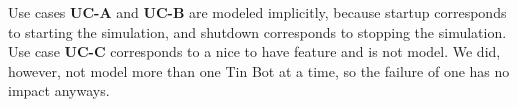 \documentclass[a4paper,parskip,headheight=38pt]{scrartcl} %
\begin{document}


Use cases \textbf{UC-A} and \textbf{UC-B} are modeled implicitly, because startup corresponds to starting the simulation, and shutdown corresponds to stopping the simulation.
Use case \textbf{UC-C} corresponds to a nice to have feature and is not model. We did, however, not model more than one Tin Bot at a time, so the failure of one has no impact anyways.
\end{document}
